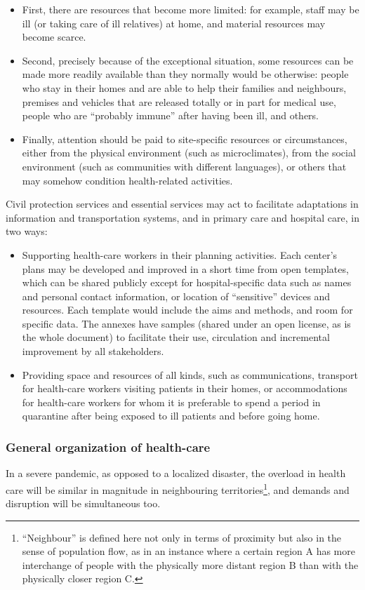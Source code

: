 \documentclass[12pt, a4]{scrartcl}
\begin{document}
\begin{itemize}
	\item First, there are resources that become more limited: for example, staff may be ill (or taking care of ill relatives) at home, and material resources may become scarce.
	\item Second, precisely because of the exceptional situation, some resources can be made more readily available than they normally would be otherwise: people who stay in their homes and are able to help their families and neighbours, premises and vehicles that are released totally or in part for medical use, people who are “probably immune” after having been ill, and others.
	\item Finally, attention should be paid to site-specific resources or circumstances, either from the physical environment (such as microclimates), from the social environment (such as communities with different languages), or others that may somehow condition health-related activities.
\end{itemize}

Civil protection services and essential services may act to facilitate adaptations in information and transportation systems, and in primary care and hospital care, in two ways:
\begin{itemize}
	\item Supporting health-care workers in their planning activities. Each center’s plans may be developed and improved in a short time from open templates, which can be shared publicly except for hospital-specific data such as names and personal contact information, or location of “sensitive” devices and resources. Each template would include the aims and methods, and room for specific data. The annexes have samples (shared under an open license, as is the whole document) to facilitate their use, circulation and incremental improvement by all stakeholders.
	\item Providing space and resources of all kinds, such as communications, transport for health-care workers visiting patients in their homes, or accommodations for health-care workers for whom it is preferable to spend a period in quarantine after being exposed to ill patients and before going home.
\end{itemize}

\subsubsection{General organization of health-care}
In a severe pandemic, as opposed to a localized disaster, the overload in health care will be similar in magnitude in neighbouring territories\footnote{“Neighbour” is defined here not only in terms of proximity but also in the sense of population flow, as in an instance where a certain region A has more interchange of people with the physically more distant region B than with the physically closer region C.}, and demands and disruption will be simultaneous too. 
\end{document}
